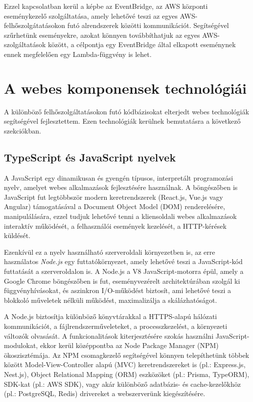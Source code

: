Ezzel kapcsolatban kerül a képbe az EventBridge, az AWS központi eseménykezelő szolgáltatása, amely lehetővé teszi az egyes AWS-felhőszolgátatásokon futó alrendszerek közötti kommunikációt. Segítségével szűrhetünk eseményekre, azokat könnyen továbbíthatjuk az egyes AWS-szolgáltatások között, a célpontja egy EventBridge által elkapott eseménynek ennek megfelelően egy Lambda-függvény is lehet.

\section{A webes komponensek technológiái}

A különböző felhőszolgáltatásokon futó kódbázisokat elterjedt webes technológiák segítségével fejlesztettem. Ezen technológiák kerülnek bemutatásra a következő szekciókban.

\subsection{TypeScript és JavaScript nyelvek}

A JavaScript egy dinamikusan és gyengén típusos, interpretált programozási nyelv, amelyet webes alkalmazások fejlesztésére használnak. A böngészőben is JavaScript fut legtöbbször modern keretrendszerek (React.js, Vue.js vagy Angular) támogatásával a Document Object Model (DOM) renderelésére, manipulálására, ezzel tudjuk lehetővé tenni a kliensoldali webes alkalmazások interaktív működését, a felhasználói események kezelését, a HTTP-kérések küldését.

Ezenkívül ez a nyelv használható szerveroldali környezetben is, az erre használatos \emph{Node.js} egy futtatókörnyezet, amely lehetővé teszi a JavaScript-kód futtatását a szerveroldalon is. A Node.js a V8 JavaScript-motorra épül, amely a Google Chrome böngészőben is fut, eseményvezérelt architektúrában szolgál ki függvényhívásokat, és aszinkron I/O-működést biztosít, ami lehetővé teszi a blokkoló műveletek nélküli működést, maximalizálja a skálázhatóságot. \cite{Node}

A Node.js biztosítja különböző könyvtárakkal a HTTPS-alapú hálózati kommunikációt, a fájlrendszerműveleteket, a processzkezelést, a környezeti változók olvasását. A funkcionalitások kiterjesztésére szokás használni JavaScript-modulokat, ekkor kerül középpontba az Node Package Manager (NPM) ökoszisztémája. Az NPM csomagkezelő segítségével könnyen telepíthetünk többek között Model-View-Controller alapú (MVC) keretrendszereket is (pl.: Express.js, Nest.js), Object Relational Mapping (ORM) eszközöket (pl.: Prisma, TypeORM), SDK-kat (pl.: AWS SDK), vagy akár különböző adatbázis- és cache-kezelőkhöz (pl.: PostgreSQL, Redis) drivereket a webszerverünk kiegészítésére.

